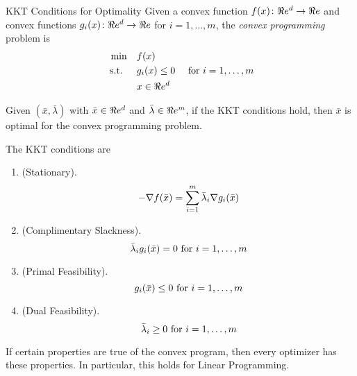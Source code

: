 \begin{general}{KKT Conditions for Optimality}{}
Given a convex function $f(x)\colon \R^d \to \R$ and convex functions $g_i(x)\colon \R^d \to \R$ for $i=1, \dots, m$,  the \emph{convex programming} problem is
\begin{equation}
\label{eq:convex-programming-KKT}
\begin{split}
\min \quad & f(x)\\
\st  \quad & g_i(x) \leq 0  \quad  \text{ for } i=1, \dots, m\\
& x \in \R^d
\end{split}
\end{equation}

Given $(\bar x, \bar \lambda)$ with $\bar x \in \R^d$ and $\bar \lambda \in \R^m$, if the KKT conditions hold, then $\bar x$ is optimal for the convex programming problem.  

The KKT conditions are
\begin{enumerate}
\item (Stationary).   
\begin{equation}
- \nabla f(\bar x) = \sum_{i=1}^m \bar \lambda_i \nabla g_i(\bar x)\\
\end{equation}
\item (Complimentary Slackness).   
\begin{equation}
 \bar \lambda_i  g_i(\bar x) = 0 \text{ for } i=1, \dots, m\\
\end{equation}
\item (Primal Feasibility).   
\begin{equation}
  g_i(\bar x) \leq 0 \text{ for } i=1, \dots, m\\
\end{equation}
\item (Dual Feasibility).   
\begin{equation}
 \bar \lambda_i \geq 0 \text{ for } i=1, \dots, m\\
\end{equation}
\end{enumerate}
\end{general}

If certain properties are true of the convex program, then every optimizer has these properties.   In particular, this holds for Linear Programming.



\begin{minipage}{0.5\textwidth}
\end{minipage}
\begin{minipage}{0.5\textwidth}
\end{minipage}





